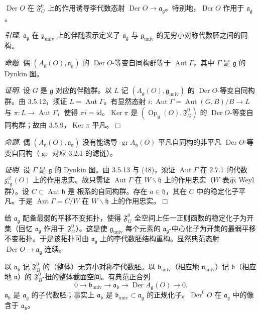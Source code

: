 $\operatorname{Der}O$ 在 $\mathfrak{F}^{0}_{G}$ 上的作用诱导李代数态射 $\operatorname{Der}O\to\mathfrak{a}_{\mathfrak{g}}$。特别地，$\operatorname{Der}O$ 作用于 $\mathfrak{a}_{\mathfrak{g}}$。

 \emph{引理.} $\mathfrak{a}_{\mathfrak{g}}$ 在 $\mathfrak{g}_{\mathrm{univ}}$ 上的伴随表示定义了 $\mathfrak{a}_{\mathfrak{g}}$ 与 $\mathfrak{g}_{\mathrm{univ}}$ 的无穷小对称代数胚之间的同构。

 \emph{命题.} 偶 $(A_{\mathfrak{g}}(O),\mathfrak{a}_{\mathfrak{g}})$ 的 $\operatorname{Der}O$-等变自同构群等于 $\operatorname{Aut}\Gamma$，其中 $\Gamma$ 是 $\mathfrak{g}$ 的 Dynkin 图。

\emph{证明.} 设 $G$ 是 $\mathfrak{g}$ 对应的伴随群。以 $L$ 记 $(A_{\mathfrak{g}}(O),\mathfrak{g}_{\mathrm{univ}})$ 的 $\operatorname{Der}O$-等变自同构群。由 3.5.12，须证 $L=\operatorname{Aut}\Gamma$。有显然态射 $i:\operatorname{Aut}\Gamma=\operatorname{Aut}(G,B)/B\to L$ 与 $\pi:L\to\operatorname{Aut}\Gamma$，使得 $\pi i=\mathrm{id}$。$\operatorname{Ker}\pi$ 是 $(\operatorname{Op}_{\mathfrak{g}}(O),\mathfrak{F}^{0}_{G})$ 的 $\operatorname{Der}O$-等变自同构群；故由 3.5.9，$\operatorname{Ker}\pi$ 平凡。\hfill$\Box$

 \emph{命题.} 偶 $(A_{\mathfrak{g}}(O),\mathfrak{a}_{\mathfrak{g}})$ 没有能诱导 $\operatorname{gr}A_{\mathfrak{g}}(O)$ 平凡自同构的非平凡 $\operatorname{Der}O$-等变自同构（$\operatorname{gr}$ 对应 3.2.1 的滤链）。

\emph{证明.} 设 $\Gamma$ 是 $\mathfrak{g}$ 的 Dynkin 图。由 3.5.13 与 (48)，须证 $\operatorname{Aut}\Gamma$ 在 2.7.1 的代数 $\mathfrak{z}^{cl}_{{}^{L}\mathfrak{g}}(O)$ 上的作用忠实。故只需证 $\operatorname{Aut}\Gamma$ 在 $W\backslash\mathfrak{h}$ 上的作用忠实（$W$ 表示 Weyl 群）。设 $C\subset\operatorname{Aut}\mathfrak{h}$ 是%
根系的自同构群。存在 $a\in\mathfrak{h}$，其在 $C$ 中的稳定化子平凡。于是 $\operatorname{Aut}\Gamma=C/W$ 在 $W\backslash\mathfrak{h}$ 上的作用忠实。\hfill$\Box$

 给 $\mathfrak{a}_{\mathfrak{g}}$ 配备最弱的平移不变拓扑，使得 $\mathfrak{F}^{0}_{G}$ 全空间上任一正则函数的稳定化子为开集（回忆 $\mathfrak{a}_{\mathfrak{g}}$ 作用于 $\mathfrak{F}^{0}_{G}$）。这是使 $\mathfrak{g}_{\mathrm{univ}}$ 每个元素的 $\mathfrak{a}_{\mathfrak{g}}$-中心化子为开集的最弱平移不变拓扑。于是该拓扑可由 $\mathfrak{a}_{\mathfrak{g}}$ 上的李代数胚结构重构。显然典范态射 $\operatorname{Der}O\to\mathfrak{a}_{\mathfrak{g}}$ 连续。

 以 $\mathfrak{a}_{\mathfrak{b}}$ 记 $\mathfrak{F}^{0}_{B}$ 的（整体）无穷小对称李代数胚。以 $\mathfrak{b}_{\mathrm{univ}}$（相应地 $\mathfrak{n}_{\mathrm{univ}}$）记 $\mathfrak{b}$（相应地 $\mathfrak{n}$）的 $\mathfrak{F}^{0}_{B}$-扭的整体截面空间。有典范正合列
\[
0\to\mathfrak{b}_{\mathrm{univ}}\to\mathfrak{a}_{\mathfrak{b}}\to\operatorname{Der}A_{\mathfrak{g}}(O)\to0.
\]
$\mathfrak{a}_{\mathfrak{b}}$ 是 $\mathfrak{a}_{\mathfrak{g}}$ 的子代数胚；事实上 $\mathfrak{a}_{\mathfrak{b}}$ 是 $\mathfrak{b}_{\mathrm{univ}}\subset\mathfrak{a}_{\mathfrak{g}}$ 的正规化子。$\operatorname{Der}^{0}O$ 在 $\mathfrak{a}_{\mathfrak{g}}$ 中的像含于 $\mathfrak{a}_{\mathfrak{b}}$。

